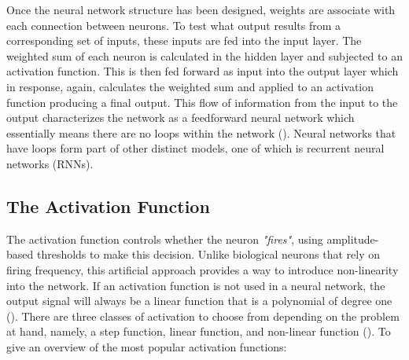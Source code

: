 \noindent Once the neural network structure has been designed, weights are associate with each connection between neurons. To test what output results from a corresponding set of inputs, these inputs are fed into the input layer. The weighted sum of each neuron is calculated in the hidden layer and subjected to an activation function. This is then fed forward as input into the output layer which in response, again, calculates the weighted sum and applied to an activation function producing a final output. This flow of information from the input to the output characterizes the network as a feedforward neural network which essentially means there are no loops within the network (\cite{nielsen2015neural}). Neural networks that have loops form part of other distinct models, one of which is recurrent neural networks (RNNs).

\subsection{The Activation Function}
The activation function controls whether the neuron \textit{"fires"}, using amplitude-based thresholds to make this decision. Unlike biological neurons that rely on firing frequency, this artificial approach provides a way to introduce non-linearity into the network. If an activation function is not used in a neural network, the output signal will always be a linear function that is a polynomial of degree one (\cite{sharma2017activation}). There are three classes of activation to choose from depending on the problem at hand, namely, a step function, linear function, and non-linear function (\cite{suzuki2011artificial}). To give an overview of the most popular activation functions:

